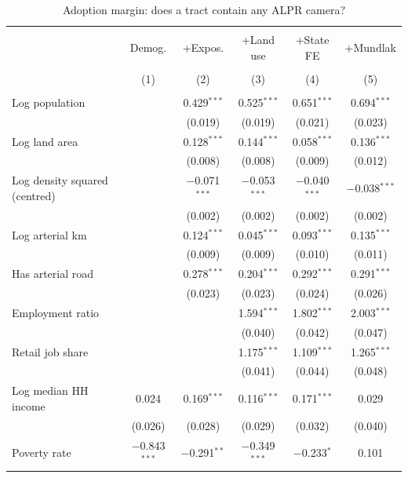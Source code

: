 
\begin{table}[!htbp] \centering 
  \caption{Adoption margin: does a tract contain any ALPR camera?} 
  \label{tab:adoption-ladder} 
\footnotesize 
\setlength{\tabcolsep}{3pt}\begin{tabular}{@{}lccccc@{}} 
\\[-1.8ex]\hline 
\hline \\[-1.8ex] 
 & Demog. & +Expos. & +Land use & +State FE & +Mundlak \\ 
\\[-1.8ex] & (1) & (2) & (3) & (4) & (5)\\ 
\hline \\[-1.8ex] 
 Log population &  & 0.429$^{***}$ & 0.525$^{***}$ & 0.651$^{***}$ & 0.694$^{***}$ \\ 
  &  & (0.019) & (0.019) & (0.021) & (0.023) \\ 
  Log land area &  & 0.128$^{***}$ & 0.144$^{***}$ & 0.058$^{***}$ & 0.136$^{***}$ \\ 
  &  & (0.008) & (0.008) & (0.009) & (0.012) \\ 
  Log density squared (centred) &  & $-$0.071$^{***}$ & $-$0.053$^{***}$ & $-$0.040$^{***}$ & $-$0.038$^{***}$ \\ 
  &  & (0.002) & (0.002) & (0.002) & (0.002) \\ 
  Log arterial km &  & 0.124$^{***}$ & 0.045$^{***}$ & 0.093$^{***}$ & 0.135$^{***}$ \\ 
  &  & (0.009) & (0.009) & (0.010) & (0.011) \\ 
  Has arterial road &  & 0.278$^{***}$ & 0.204$^{***}$ & 0.292$^{***}$ & 0.291$^{***}$ \\ 
  &  & (0.023) & (0.023) & (0.024) & (0.026) \\ 
  Employment ratio &  &  & 1.594$^{***}$ & 1.802$^{***}$ & 2.003$^{***}$ \\ 
  &  &  & (0.040) & (0.042) & (0.047) \\ 
  Retail job share &  &  & 1.175$^{***}$ & 1.109$^{***}$ & 1.265$^{***}$ \\ 
  &  &  & (0.041) & (0.044) & (0.048) \\ 
  Log median HH income & 0.024 & 0.169$^{***}$ & 0.116$^{***}$ & 0.171$^{***}$ & 0.029 \\ 
  & (0.026) & (0.028) & (0.029) & (0.032) & (0.040) \\ 
  Poverty rate & $-$0.843$^{***}$ & $-$0.291$^{**}$ & $-$0.349$^{***}$ & $-$0.233$^{*}$ & 0.101 \\ 

\end{tabular}
\end{table}
